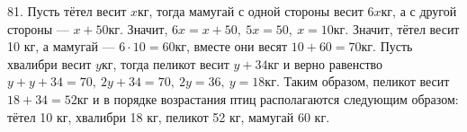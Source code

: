 81. Пусть тётел весит $x$кг, тогда мамугай с одной стороны весит $6x$кг, а с другой стороны --- $x+50$кг. Значит, $6x=x+50,\ 5x=50,\ x=10$кг. Значит, тётел весит 10 кг, а мамугай --- $6\cdot10=60$кг, вместе они весят $10+60=70$кг. Пусть хвалибри весит $y$кг, тогда пеликот весит $y+34$кг и верно равенство $y+y+34=70,\ 2y+34=70,\ 2y=36,\ y=18$кг. Таким образом, пеликот весит $18+34=52$кг и в порядке возрастания птиц располагаются следующим образом: тётел 10 кг, хвалибри 18 кг, пеликот 52 кг, мамугай 60 кг.\\
